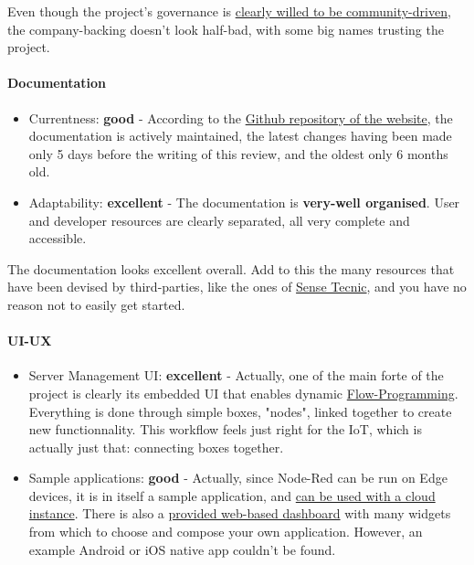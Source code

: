 \documentclass{article}
\begin{document}
Even though the project's governance is \href{https://nodered.org/about/governance/}{clearly willed to be community-driven}, the company-backing doesn't look half-bad, with some big names trusting the project.

\paragraph{Documentation}

\begin{itemize}
\item Currentness: \textbf{good} - According to the \href{https://github.com/node-red/node-red.github.io/tree/master/docs}{Github repository of the website}, the documentation is actively maintained, the latest changes having been made only 5 days before the writing of this review, and the oldest only 6 months old.
\item Adaptability: \textbf{excellent} - The documentation is \textbf{very-well organised}. User and developer resources are clearly separated, all very complete and accessible.
\end{itemize}

The documentation looks excellent overall. Add to this the many resources that have been devised by third-parties, like the ones of \href{http://noderedguide.com/}{Sense Tecnic}, and you have no reason not to easily get started.

\paragraph{UI-UX}

\begin{itemize}
\item Server Management UI: \textbf{excellent} - Actually, one of the main forte of the project is clearly its embedded UI that enables dynamic \href{https://en.wikipedia.org/wiki/Flow-based_programming}{Flow-Programming}. Everything is done through simple boxes, "nodes", linked together to create new functionnality. This workflow feels just right for the IoT, which is actually just that: connecting boxes together.
\item Sample applications: \textbf{good} - Actually, since Node-Red can be run on Edge devices, it is in itself a sample application, and \href{http://developers.sensetecnic.com/article/tutorial-connecting-device-node-red-to-cloud-node-red/}{can be used with a cloud instance}. There is also a \href{https://github.com/node-red/node-red-dashboard}{provided web-based dashboard} with many widgets from which to choose and compose your own application. However, an example Android or iOS native app couldn't be found.
\end{itemize}
\end{document}
